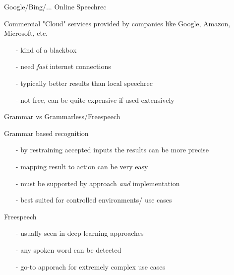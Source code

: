 \documentclass{beamer}
\begin{document}
	\begin{frame}{Google/Bing/... Online Speechrec}
		\begin{alertblock}{Commercial "Cloud" services provided by companies like Google, Amazon, Microsoft, etc.}
			\begin{itemize}
				\item[-] kind of a blackbox
				\item[-] need \emph{fast} internet connections
				\item[-] typically better results than local speechrec
				\item[-] not free, can be quite expensive if used extensively
			\end{itemize}
		\end{alertblock}
	\end{frame}
	
	
	\begin{frame}{Grammar vs Grammarless/Freespeech}
		\begin{alertblock}{Grammar based recognition}
			\begin{itemize}
				\item[-] by restraining accepted inputs the results can be more precise
				\item[-] mapping result to action can be very easy
				\item[-] must be supported by approach \emph{and} implementation
				\item[-] best suited for controlled environments/ use cases
			\end{itemize}
		\end{alertblock}
		\begin{alertblock}{Freespeech}
			\begin{itemize}
				\item[-] usually seen in deep learning approaches
				\item[-] any spoken word can be detected
				\item[-] go-to apporach for extremely complex use cases
			\end{itemize}
		\end{alertblock}
	\end{frame}
	
\end{document}
